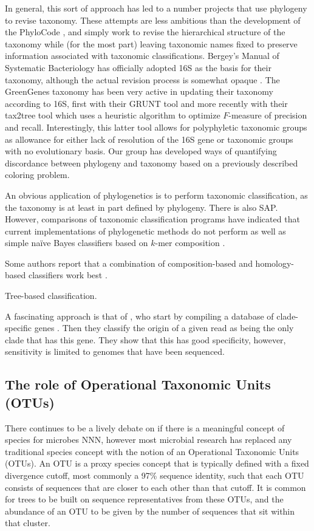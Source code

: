 \documentclass{amsart}
\begin{document}
In general, this sort of approach has led to a number projects that use phylogeny to revise taxonomy.
These attempts are less ambitious than the development of the PhyloCode \citep{forey2001phylocode}, and simply work to revise the hierarchical structure of the taxonomy while (for the most part) leaving taxonomic names fixed to preserve information associated with taxonomic classifications.
Bergey's Manual of Systematic Bacteriology has officially adopted 16S as the basis for their taxonomy, although the actual revision process is somewhat opaque \citep{kreig1984bergey}.
The GreenGenes taxonomy \citep{desantis2006greengenes} has been very active in updating their taxonomy according to 16S, first with their GRUNT tool \citep{dalevi2007automated} and more recently with their tax2tree tool \citep{mcdonald2011improved} which uses a heuristic algorithm to optimize $F$-measure of precision and recall.
Interestingly, this latter tool allows for polyphyletic taxonomic groups as allowance for either lack of resolution of the 16S gene or taxonomic groups with no evolutionary basis.
Our group \citep{matsen2012reconciling} has developed ways of quantifying discordance between phylogeny and taxonomy based on a previously described coloring problem.

An obvious application of phylogenetics is to perform taxonomic classification, as the taxonomy is at least in part defined by phylogeny.
There is also SAP.
However, comparisons of taxonomic classification programs \citep{liu2008accurate,bazinet2012comparative} have indicated that current implementations of phylogenetic methods do not perform as well as simple na\"ive Bayes classifiers based on $k$-mer composition \citep{wang2007naive,rosen2008metagenome}.

Some authors report that a combination of composition-based and homology-based classifiers work best \citep{brady2009phymm,parks2011classifying}.

Tree-based classification.

A fascinating approach is that of \citet{segata2012metagenomic}, who start by compiling a database of clade-specific genes \citep{segata2011metagenomic}.
Then they classify the origin of a given read as being the only clade that has this gene.
They show that this has good specificity, however, sensitivity is limited to genomes that have been sequenced.

\subsection{The role of Operational Taxonomic Units (OTUs)}
There continues to be a lively debate on if there is a meaningful concept of species for microbes NNN, however most microbial research has replaced any traditional species concept with the notion of an Operational Taxonomic Units (OTUs).
An OTU is a proxy species concept that is typically defined with a fixed divergence cutoff, most commonly a 97\% sequence identity, such that each OTU consists of sequences that are closer to each other than that cutoff.
It is common for trees to be built on sequence representatives from these OTUs, and the abundance of an OTU to be given by the number of sequences that sit within that cluster.
\end{document}
